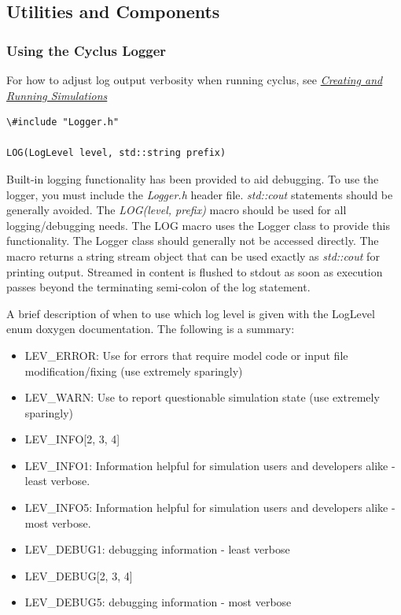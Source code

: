 \documentclass[letterpaper,10pt,english]{sphinxmanual}
\begin{document}
\subsection{Utilities and Components}
\label{devdoc/main:utilities-and-components}

\subsubsection{Using the Cyclus Logger}
\label{devdoc/logger:using-the-cyclus-logger}\label{devdoc/logger::doc}
For how to adjust log output verbosity when running cyclus, see
{\hyperref[usrdoc/creating_and_running_sims::doc]{\emph{Creating and Running Simulations}}}

\begin{Verbatim}[commandchars=\\\{\}]
\#include "Logger.h"

LOG(LogLevel level, std::string prefix)
\end{Verbatim}

Built-in logging functionality has been provided to aid debugging.  To use the
logger, you must include the \emph{Logger.h} header file. \emph{std::cout} statements
should be generally avoided.  The \emph{LOG(level, prefix)} macro should be used for
all logging/debugging needs.  The LOG macro uses the Logger class to provide
this functionality.  The Logger class should generally not be accessed
directly.  The macro returns a string stream object that can be used exactly as
\emph{std::cout} for printing output.  Streamed in content is flushed to stdout as
soon as execution passes beyond the terminating semi-colon of the log
statement.

A brief description of when to use which log level is given with the
LogLevel enum doxygen documentation. The following is a summary:
\begin{itemize}
\item {} 
LEV\_ERROR: Use for errors that require model code or input file
modification/fixing (use extremely sparingly)

\item {} 
LEV\_WARN: Use to report questionable simulation state (use extremely
sparingly)

\item {} 
LEV\_INFO{[}2, 3, 4{]}

\item {} 
LEV\_INFO1: Information helpful for simulation users and developers alike -
least verbose.

\item {} 
LEV\_INFO5: Information helpful for simulation users and developers alike -
most verbose.

\item {} 
LEV\_DEBUG1: debugging information - least verbose

\item {} 
LEV\_DEBUG{[}2, 3, 4{]}

\item {} 
LEV\_DEBUG5: debugging information - most verbose

\end{itemize}
\end{document}
